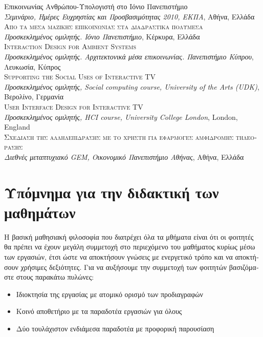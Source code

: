 \documentclass[11pt, a4paper]{article}
\providecommand{\tightlist}{%
  \setlength{\itemsep}{0pt}\setlength{\parskip}{0pt}}
\newcommand{\note}[1]{\marginnote{\scriptsize #1}}
\begin{document}
\begin{greek}
{Επικοινωνίας Ανθρώπου-Υπολογιστή στο Ιόνιο Πανεπιστήμιο}\\
\emph{Σεμινάριο, Ημέρες Ευχρηστίας και Προσβασιμότητας 2010,
ΕΚΠΑ}, Αθήνα, Ελλάδα\\[.2cm]
\note{2007}\textsc{Από τα μέσα μαζικής επικοινωνίας στα διαδραστικά
πολυμέσα}\\
\emph{Προσκεκλημένος ομιλητής. Ιόνιο Πανεπιστήμιο}, Κέρκυρα,
Ελλάδα\\[.2cm]
\note{2006}\textsc{Interaction Design for Ambient Systems}\\
\emph{Προσκεκλημένος ομιλητής. Αρχιτεκτονικά μέσα επικοινωνίας.
Πανεπιστήμιο Κύπρου}, Λευκωσία, Κύπρος\\[.2cm]
\note{2006}\textsc{Supporting the Social Uses of Interactive TV}\\
\emph{Προσκεκλημένος ομιλητής, Social computing course, University of
the Arts (UDK)}, Βερολίνο, Γερμανία\\[.2cm]
\note{2005}\textsc{User Interface Design for Interactive TV}\\
\emph{Προσκεκλημένος ομιλητής, HCI course, University College
London}, London, England\\[.2cm]
\note{2002}\textsc{Σχεδίαση της αλληλεπίδρασης με το χρήστη για
εφαρμογές αμφίδρομης τηλεόρασης}\\
\emph{Διεθνές μεταπτυχιακό GEM, Οικονομικό Πανεπιστήμιο Αθήνας}, Αθήνα,
Ελλάδα\\[.2cm]

\hypertarget{ux3c5ux3c0ux3ccux3bcux3bdux3b7ux3bcux3b1-ux3b3ux3b9ux3b1-ux3c4ux3b7ux3bd-ux3b4ux3b9ux3b4ux3b1ux3baux3c4ux3b9ux3baux3ae-ux3c4ux3c9ux3bd-ux3bcux3b1ux3b8ux3b7ux3bcux3acux3c4ux3c9ux3bd}{%
\section{Υπόμνημα για την διδακτική των
μαθημάτων}\label{ux3c5ux3c0ux3ccux3bcux3bdux3b7ux3bcux3b1-ux3b3ux3b9ux3b1-ux3c4ux3b7ux3bd-ux3b4ux3b9ux3b4ux3b1ux3baux3c4ux3b9ux3baux3ae-ux3c4ux3c9ux3bd-ux3bcux3b1ux3b8ux3b7ux3bcux3acux3c4ux3c9ux3bd}}

Η βασική μαθησιακή φιλοσοφία που διατρέχει όλα τα μθήματα είναι ότι οι
φοιτητές θα πρέπει να έχουν μεγάλη συμμετοχή στο περιεχόμενο του
μαθήματος κυρίως μέσω των εργασιών, έτσι ώστε να αποκτήσουν γνώσεις με
ενεργετικό τρόπο και να αποκτήσουν χρήσιμες δεξιότητες. Για να αυξήσουμε
την συμμετοχή των φοιτητών βασιζόμαστε στους παρακάτω πυλώνες:

\begin{itemize}
\tightlist
\item
  Ιδιοκτησία της εργασίας με ατομικό ορισμό των προδιαγραφών
\item
  Κοινό αποθετήριο με τα παραδοτέα εργασιών για όλους
\item
  Δύο τουλάχιστον ενδιάμεσα παραδοτέα με προφορική παρουσίαση
\end{itemize}


\end{greek}
\end{document}
